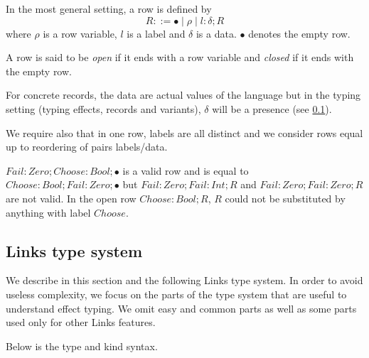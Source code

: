 \documentclass[11pt, nonacm=true, language=french, language=english]{acmart}
\begin{document}
In the most general setting, a row is defined by
\[
  R ::= \bullet \mid \rho \mid l:\delta;R
\]
where $\rho$ is a row variable, $l$ is a label and $\delta$ is a data. $\bullet$ denotes the empty row.

A row is said to be \emph{open} if it ends with a row variable and \emph{closed} if it ends with the empty row.

For concrete records, the data are actual values of the language but in the typing setting (typing effects, records and variants), $\delta$ will be a presence (see \ref{sec:links-typ}).

We require also that in one row, labels are all distinct and we consider rows equal up to reordering of pairs labels/data.

\begin{ex}
  $Fail:Zero; Choose:Bool; \bullet$ is a valid row and is equal to $Choose:Bool; Fail:Zero; \bullet$ but $Fail:Zero; Fail:Int; R$ and $Fail:Zero; Fail:Zero; R$ are not valid. In the open row $Choose:Bool; R$, $R$ could not be substituted by anything with label $Choose$.
\end{ex}


\subsection{Links type system}
\label{sec:links-typ}

We describe in this section and the following Links type system. In order to avoid useless complexity, we focus on the parts of the type system that are useful to understand effect typing. We omit easy and common parts as well as some parts used only for other Links features.

Below is the type and kind syntax.
\end{document}
